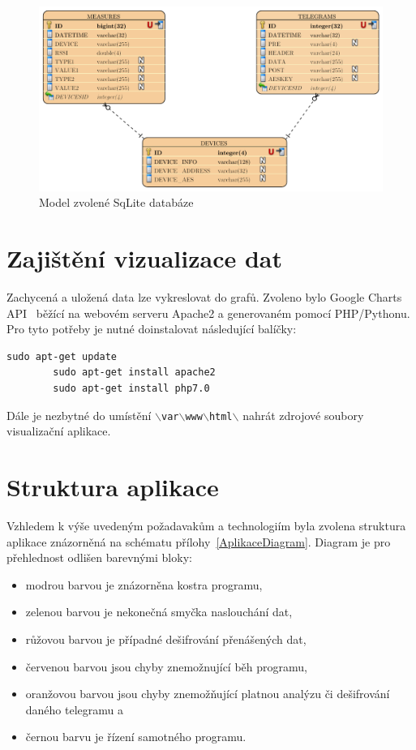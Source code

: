 \begin{figure}[!ht]
  \begin{center}
    \includegraphics[scale=0.55]{obrazky/aplikace_databaze}
  \end{center}
	\vspace{-10pt}
  \caption{Model zvolené SqLite databáze}
	\label{databazovy_model}
	\vspace{-30pt}
\end{figure}
	
\section{Zajištění vizualizace dat}	
Zachycená a uložená data lze vykreslovat do grafů. Zvoleno bylo Google Charts API~\cite{uvod_google_charts_api} běžící na webovém serveru Apache2 a generovaném pomocí PHP/Pythonu. Pro tyto potřeby je nutné doinstalovat následující balíčky:
 
\begin{lstlisting}[style=MyCodeBash]
		sudo apt-get update
		sudo apt-get install apache2
		sudo apt-get install php7.0 
	\end{lstlisting}

Dále je nezbytné do umístění \texttt{$\backslash$var$\backslash$www$\backslash$html$\backslash$} nahrát zdrojové soubory visualizační aplikace. 

\section{Struktura aplikace}
Vzhledem k výše uvedeným požadavakům a technologiím byla zvolena struktura aplikace znázorněná na schématu přílohy~\ref{AplikaceDiagram}. Diagram je pro přehlednost odlišen barevnými bloky:
\begin{itemize}
	\item modrou barvou je znázorněna kostra programu,
	\item zelenou barvou je nekonečná smyčka naslouchání dat,
	\item růžovou barvou je případné dešifrování přenášených dat,
	\item červenou barvou jsou chyby znemožnující běh programu,
	\item oranžovou barvou jsou chyby znemožňující platnou analýzu či dešifrování daného telegramu a
	\item černou barvu je řízení samotného programu.
\end{itemize}

